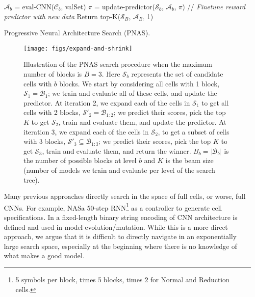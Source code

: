 \documentclass[runningheads]{llncs}
\newcommand{\NAS}{NAS}
\newcommand{\NAScell}{\NAS}
\begin{document}
\begin{algorithm}[t]
\begin{algorithmic}
\STATE $\mathcal{A}_b$ = eval-CNN($\mathcal{C}_b$, valSet) 
\STATE $\pi$ = update-predictor($\mathcal{S}_b$, $\mathcal{A}_b$, $\pi$) // {\it Finetune reward predictor with new data}
\ENDFOR
\STATE Return top-K($\mathcal{S}_B$, $\mathcal{A}_B$, 1) 
\end{algorithmic}
\caption{Progressive Neural Architecture Search (PNAS).
}
\label{alg:pnas}
\end{algorithm}\begin{figure}[t]
    \centering
    \begin{minipage}[c]{0.49\textwidth}
    \texttt{[image: figs/expand-and-shrink]}
    \end{minipage} \hfill
    \begin{minipage}[c]{0.5\textwidth}
    \caption{Illustration of the PNAS search procedure when the maximum number of blocks is $B=3$.
    Here $\mathcal{S}_b$ represents the set of candidate cells with $b$ blocks.
    We start by considering all cells with 1 block, $\mathcal{S}_1 = \mathcal{B}_1$;
    we train and evaluate all of these cells, and update the predictor.
    At iteration 2, we expand each of the cells in $\mathcal{S}_1$ 
    to get all cells with 2 blocks, $\mathcal{S}'_2 = \mathcal{B}_{1:2}$;
    we predict their scores, pick the top $K$ to get $\mathcal{S}_2$,
    train and evaluate them, and update the predictor.
    At iteration 3, we expand each of the cells in $\mathcal{S}_2$,  to get a subset of cells with 3 blocks,
    $\mathcal{S}'_3 \subseteq \mathcal{B}_{1:3}$;
     we predict their scores, pick the top $K$ to get $\mathcal{S}_3$, train and evaluate them,
     and return the winner.
 $B_b = |\mathcal{B}_b|$ is the number of possible blocks at level $b$
    and $K$ is the beam size (number of models we
    train and evaluate per level of the search tree).
    }
    \label{fig:PNAStree}
    \end{minipage}
\end{figure}Many previous approaches directly search in the space of full cells,
or worse,
full CNNs.
For example, \NAScell\uses a 50-step RNN\footnote{5 symbols per block, times 5 blocks, times 2 for Normal and Reduction cells.
}%
as a controller to generate cell specifications.
In \cite{DBLP:journals/corr/XieY17} a fixed-length binary string encoding of CNN architecture is defined and used in model evolution/mutation.
While this is a more direct approach, we argue that it is difficult to directly navigate in an exponentially large search space, especially at the beginning where there is no knowledge of what makes a good model.
\end{document}

